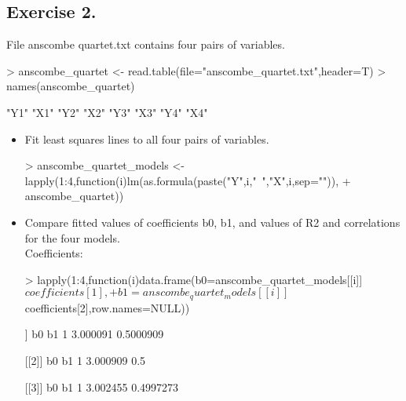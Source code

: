 \documentclass[a4paper]{article}
\begin{document}
\subsection{Exercise 2.} File anscombe quartet.txt contains four pairs of variables.
\begin{Schunk}
\begin{Sinput}
> anscombe_quartet <- read.table(file="anscombe_quartet.txt",header=T)
> names(anscombe_quartet)
\end{Sinput}
\begin{Soutput}
[1] "Y1" "X1" "Y2" "X2" "Y3" "X3" "Y4" "X4"
\end{Soutput}
\end{Schunk}
\begin{itemize}
\item Fit least squares lines to all four pairs of variables.
\begin{Schunk}
\begin{Sinput}
> anscombe_quartet_models <- lapply(1:4,function(i){lm(as.formula(paste("Y",i,"~","X",i,sep="")),
+                                                      anscombe_quartet)})
\end{Sinput}
\end{Schunk}
\item Compare fitted values of coefficients b0, b1, and values of R2 and correlations for the four models.
\\

Coefficients:
\begin{Schunk}
\begin{Sinput}
> lapply(1:4,function(i){data.frame(b0=anscombe_quartet_models[[i]]$coefficients[1],
+                                   b1=anscombe_quartet_models[[i]]$coefficients[2],row.names=NULL)})
\end{Sinput}
\begin{Soutput}
[[1]]
        b0        b1
1 3.000091 0.5000909

[[2]]
        b0  b1
1 3.000909 0.5

[[3]]
        b0        b1
1 3.002455 0.4997273


\end{Soutput}
\end{Schunk}
\end{itemize}
\end{document}
